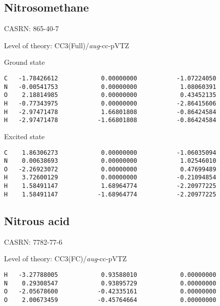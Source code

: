 \documentclass[journal=jctcce,manuscript=article,layout=traditional]{achemso}
\newcommand{\AVTZ}{\emph{aug}-cc-pVTZ}
\begin{document}
\subsection{Nitrosomethane}

CASRN: 865-40-7

\begin{singlespace}
\noindent   Level of theory: CC3(Full)/{\AVTZ}
\end{singlespace}


\begin{singlespace}
\noindent Ground state
\begin{verbatim}
C   -1.78426612            0.00000000           -1.07224050
N   -0.00541753            0.00000000            1.08060391
O    2.18814985            0.00000000            0.43452135
H   -0.77343975            0.00000000           -2.86415606
H   -2.97471478            1.66801808           -0.86424584
H   -2.97471478           -1.66801808           -0.86424584
\end{verbatim}
\end{singlespace}

\begin{singlespace}
\noindent Excited state
\begin{verbatim}
C    1.86306273            0.00000000           -1.06035094
N    0.00638693            0.00000000            1.02546010
O   -2.26923072            0.00000000            0.47699489
H    3.72600129            0.00000000           -0.21094854
H    1.58491147            1.68964774           -2.20977225
H    1.58491147           -1.68964774           -2.20977225
\end{verbatim}
\end{singlespace}

\subsection{Nitrous acid}

CASRN: 7782-77-6

\begin{singlespace}
\noindent   Level of theory: CC3(FC)/{\AVTZ}
\begin{verbatim}
H   -3.27788005            0.93588010            0.00000000
N    0.29308547            0.93895729            0.00000000
O   -2.05678600           -0.42335161            0.00000000
O    2.00673459           -0.45764664            0.00000000
\end{verbatim}
\end{singlespace}
\end{document}
